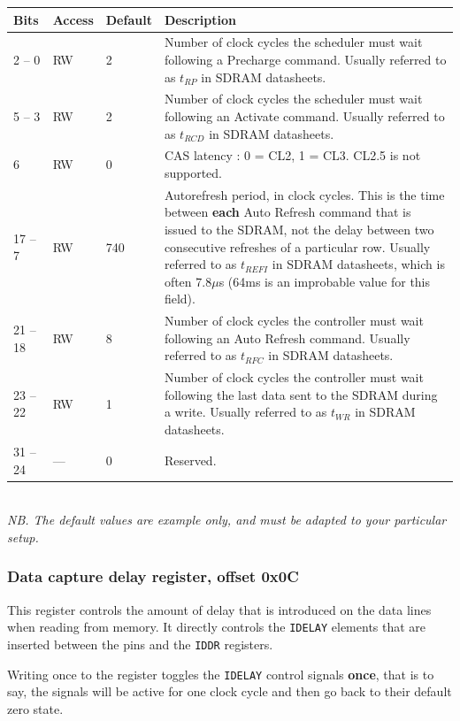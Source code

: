 \documentclass[a4paper,11pt]{article}
\begin{document}
\begin{tabular}{|p{1.5cm}|l|l|p{10cm}|}
\hline
\bf Bits & \bf Access & \bf Default & \bf Description \\
\hline
2 -- 0 & RW & 2 & Number of clock cycles the scheduler must wait following a Precharge command. Usually referred to as $t_{RP}$ in SDRAM datasheets. \\
\hline
5 -- 3 & RW & 2 & Number of clock cycles the scheduler must wait following an Activate command. Usually referred to as $t_{RCD}$ in SDRAM datasheets. \\
\hline
6 & RW & 0 & CAS latency : 0 = CL2, 1 = CL3. CL2.5 is not supported. \\
\hline
17 -- 7 & RW & 740 & Autorefresh period, in clock cycles. This is the time between \textbf{each} Auto Refresh command that is issued to the SDRAM, not the delay between two consecutive refreshes of a particular row. Usually referred to as $t_{REFI}$ in SDRAM datasheets, which is often  7.8$\mu$s  (64ms is an improbable value for this field). \\
\hline
21 -- 18 & RW & 8 & Number of clock cycles the controller must wait following an Auto Refresh command. Usually referred to as $t_{RFC}$ in SDRAM datasheets. \\
\hline
23 -- 22 & RW & 1 & Number of clock cycles the controller must wait following the last data sent to the SDRAM during a write. Usually referred to as $t_{WR}$ in SDRAM datasheets. \\
\hline
31 -- 24 & --- & 0 & Reserved. \\
\hline
\end{tabular}\\

\textit{NB. The default values are example only, and must be adapted to your particular setup.}

\subsubsection{Data capture delay register, offset 0x0C}
This register controls the amount of delay that is introduced on the data lines when reading from memory. It directly controls the \verb!IDELAY! elements that are inserted between the pins and the \verb!IDDR! registers.

Writing once to the register toggles the \verb!IDELAY! control signals \textbf{once}, that is to say, the signals will be active for one clock cycle and then go back to their default zero state.\\
\end{document}
